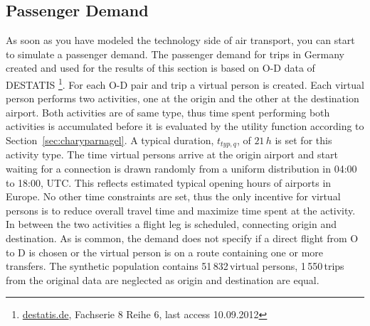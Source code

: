 \subsection{Passenger Demand}


As soon as you have modeled the technology side of air transport, you can start to simulate a passenger demand. 
The passenger demand for trips in Germany created and used for the results of this section is based on O-D data of DESTATIS 
\footnote{\url{destatis.de}, Fachserie 8 Reihe 6, last access 10.09.2012}. 
For each O-D pair and trip a virtual person is created.
Each virtual person performs two activities, one at the origin and the other at the destination airport. 
Both activities are of same type, thus time spent performing both activities is accumulated before it is evaluated by the utility function according to Section~\ref{sec:charyparnagel}. %
A typical duration, $t_{typ,q}$, of $21 \, h$ is set for this activity type. 
The time virtual persons arrive at the origin airport and start waiting for a connection is drawn randomly from a uniform distribution in 04:00 to 18:00, UTC. 
This reflects estimated typical opening hours of airports in Europe.
No other time constraints are set, thus the only incentive for virtual persons is to reduce overall travel time and maximize time spent at the activity. 
In between the two activities a flight leg is scheduled, connecting origin and destination.
As is common, the demand does not specify if a direct flight from O to D is chosen or the virtual person is on a route containing one or more transfers.
The synthetic population contains 51\,832\,virtual persons, 1\,550\,trips from the original data are neglected as origin and destination are equal. 
%

